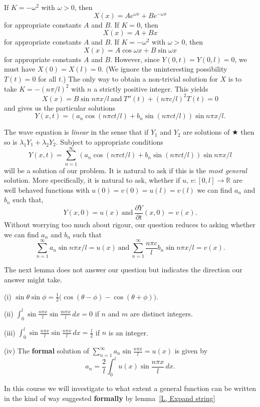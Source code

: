 If $K=-\omega^{2}$ with $\omega>0$, then
\[X(x)=Ae^{\omega x}+Be^{-\omega x}\]
for appropriate constants $A$ and $B$.
If $K=0$, then
\[X(x)=A+Bx\]
for appropriate constants $A$ and $B$.
If $K=-\omega^{2}$ with $\omega>0$, then
\[X(x)=A\cos \omega x+B\sin \omega x\]
for appropriate constants $A$ and $B$.
However, since $Y(0,t)=Y(0,l)=0$,
we must have $X(0)=X(l)=0$. (We ignore the
uninteresting possibility $T(t)=0$ for all $t$.)
The only way to obtain a non-trivial solution
for $X$ is to take $K=-(n\pi/l)^{2}$ with $n$
a strictly positive integer. This yields
\[X(x)=B\sin{n\pi x/l}
\ \text{and}\ T''(t)+(n\pi c/l)^{2}T(t)=0\]
and gives us the particular solutions
\[Y(x,t)=(a_{n}\cos(n\pi ct/l)+b_{n}\sin(n\pi ct/l))
\sin{n\pi x/l}.\]

The wave equation is \emph{linear} in the sense that
if $Y_{1}$ and $Y_{2}$ are solutions of $\bigstar$
then so is $\lambda_{1}Y_{1}+\lambda_{2}Y_{2}$.
Subject to appropriate conditions
\[Y(x,t)=\sum_{n=1}^{\infty}
(a_{n}\cos(n\pi ct/l)+b_{n}\sin(n\pi ct/l))
\sin{n\pi x/l}\]
will be a solution of our problem. It is natural
to ask if this is the \emph{most general} solution.
More specifically, it is natural to ask, whether
if $u,\,v:[0,l]\rightarrow{\mathbb R}$
are well behaved functions with $u(0)=v(0)=u(l)=v(l)$
we can find $a_{n}$ and $b_{n}$ such that,
\[Y(x,0)=u(x)\ \text{and}\ \frac{\partial Y}{\partial t}(x,0)=v(x).\]
Without worrying too much about rigour, our question reduces to
asking whether we can find $a_{n}$ and $b_{n}$
such that
\[\sum_{n=1}^{\infty}a_{n}\sin{n\pi x/l}=u(x)
\ \text{and}
\ \sum_{n=1}^{\infty}\frac{n\pi c}{l}b_{n}\sin{n\pi x/l}=v(x).\]

The next lemma does not answer our question but
indicates the direction our answer might take.
\begin{lemma}\label{L, Expand string}
(i) $\sin\theta\sin\phi=\tfrac{1}{2}
\big(\cos(\theta-\phi)-\cos(\theta+\phi)\big)$.

(ii) ${\displaystyle
\int_{0}^{l}\sin\frac{n\pi x}{l}\sin\frac{m\pi x}{l}\,dx=0}$
if $n$ and $m$ are distinct integers.

(iii) ${\displaystyle
\int_{0}^{l}\sin\frac{n\pi x}{l}\sin\frac{n\pi x}{l}\,dx=\frac{l}{2}}$
if $n$ is an integer.

(iv) The {\bf formal} solution of
$\sum_{n=1}^{\infty}a_{n}\sin\frac{n\pi x}{l}=u(x)$
is given by
\[a_{n}=\frac{2}{l}\int_{0}^{l}u(x)\sin\frac{n\pi x}{l}\,dx.\]
\end{lemma}
In this course we will investigate to what extent
a general function can be written in the kind of way
suggested {\bf formally} by lemma~\ref{L, Expand string}

